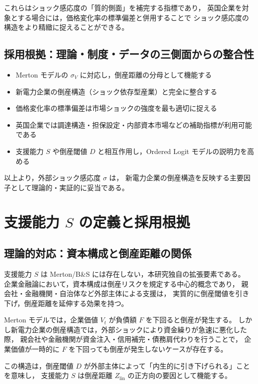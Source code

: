 これらはショック感応度の「質的側面」を補完する指標であり，
英国企業を対象とする場合には，価格変化率の標準偏差と併用することで
ショック感応度の構造をより精緻に捉えることができる。

\subsection{採用根拠：理論・制度・データの三側面からの整合性}

\begin{itemize}
    \item Merton モデルの $\sigma_V$ に対応し，倒産距離の分母として機能する
    \item 新電力企業の倒産構造（ショック依存型産業）と完全に整合する
    \item 価格変化率の標準偏差は市場ショックの強度を最も適切に捉える
    \item 英国企業では調達構造・担保設定・内部資本市場などの補助指標が利用可能である
    \item 支援能力 $S$ や倒産閾値 $D$ と相互作用し，Ordered Logit モデルの説明力を高める
\end{itemize}

以上より，外部ショック感応度 $\sigma$ は，
新電力企業の倒産構造を反映する主要因子として理論的・実証的に妥当である。


\section{支援能力 $S$ の定義と採用根拠}

\subsection{理論的対応：資本構成と倒産距離の関係}

支援能力 $S$ は Merton/B\&S には存在しない，本研究独自の拡張要素である。
企業金融論において，資本構成は倒産リスクを規定する中心的概念であり，
親会社・金融機関・自治体など外部主体による支援は，
実質的に倒産閾値を引き下げ，倒産距離を延伸する効果を持つ。

Merton モデルでは，企業価値 $V_t$ が負債額 $F$ を下回ると倒産が発生する。
しかし新電力企業の倒産構造では，外部ショックにより資金繰りが急速に悪化した際，
親会社や金融機関が資金注入・信用補完・債務肩代わりを行うことで，
企業価値が一時的に $F$ を下回っても倒産が発生しないケースが存在する。

この構造は，倒産閾値 $D$ が外部主体によって「内生的に引き下げられる」ことを意味し，
支援能力 $S$ は倒産距離 $Z_{\text{lin}}$ の正方向の要因として機能する。



